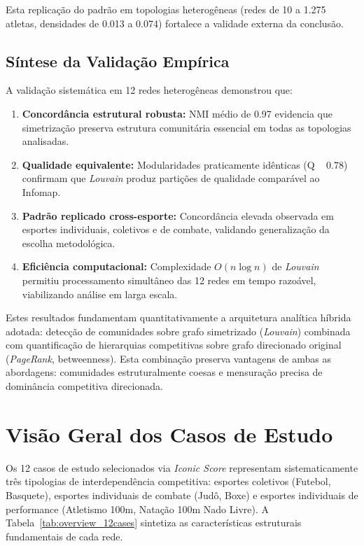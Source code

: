 Esta replicação do padrão em topologias heterogêneas (redes de 10 a 1.275 atletas, densidades de 0.013 a 0.074) fortalece a validade externa da conclusão.

\subsection{Síntese da Validação Empírica}

A validação sistemática em 12 redes heterogêneas demonstrou que:

\begin{enumerate}
    \item \textbf{Concordância estrutural robusta:} NMI médio de 0.97 evidencia que simetrização preserva estrutura comunitária essencial em todas as topologias analisadas.

    \item \textbf{Qualidade equivalente:} Modularidades praticamente idênticas (Q ~ 0.78) confirmam que \textit{Louvain} produz partições de qualidade comparável ao Infomap.

    \item \textbf{Padrão replicado cross-esporte:} Concordância elevada observada em esportes individuais, coletivos e de combate, validando generalização da escolha metodológica.

    \item \textbf{Eficiência computacional:} Complexidade $O(n \log n)$ de \textit{Louvain} permitiu processamento simultâneo das 12 redes em tempo razoável, viabilizando análise em larga escala.
\end{enumerate}

Estes resultados fundamentam quantitativamente a arquitetura analítica híbrida adotada: detecção de comunidades sobre grafo simetrizado (\textit{Louvain}) combinada com quantificação de hierarquias competitivas sobre grafo direcionado original (\textit{PageRank}, betweenness). Esta combinação preserva vantagens de ambas as abordagens: comunidades estruturalmente coesas e mensuração precisa de dominância competitiva direcionada.

\section{Visão Geral dos Casos de Estudo}

Os 12 casos de estudo selecionados via \textit{Iconic Score}{} representam sistematicamente três tipologias de interdependência competitiva: esportes coletivos (Futebol, Basquete), esportes individuais de combate (Judô, Boxe) e esportes individuais de performance (Atletismo 100m, Natação 100m Nado Livre). A Tabela~\ref{tab:overview_12cases} sintetiza as características estruturais fundamentais de cada rede.


